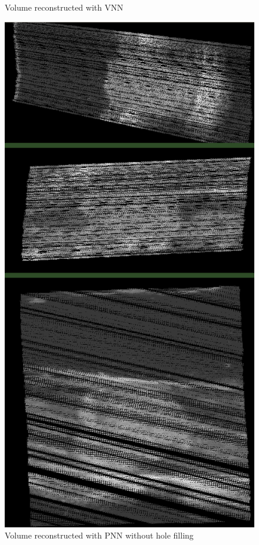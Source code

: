 \begin{figure}
\begin{minipage}[b]{0.326\textwidth}
	\caption{Volume reconstructed with VNN}
	\label{fig:large_vnn}
\end{minipage}
\hspace{0.01\textwidth}
\begin{minipage}[b]{0.326\textwidth}
	\centering
	\includegraphics[width=\textwidth]{graphics/large_pnn_holes.png}
	\caption{Volume reconstructed with PNN without hole filling}
	\label{fig:large_pnn_holes}
\end{minipage}
\end{figure}


